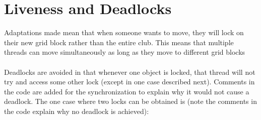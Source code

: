 \documentclass{assignment}
\begin{document}
\section{Liveness and Deadlocks}
Adaptations made mean that when someone wants to move, they will lock on their new grid block rather than the entire club. This means that multiple threads can move simultaneously as long as they move to different grid blocks \\ 
~\\
Deadlocks are avoided in that whenever one object is locked, that thread will not try and access some other lock (except in one case described next). Comments in the code are added for the synchronization to explain why it would not cause a deadlock. The one case where two locks can be obtained is (note the comments in the code explain why no deadlock is achieved):
\begin{center}
     
\end{center}
\end{document}
